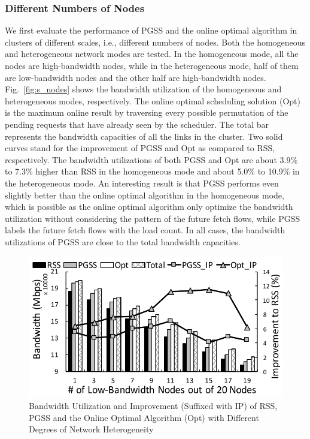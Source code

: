 \documentclass[10pt,journal,compsoc]{IEEEtran}
\begin{document}
\subsubsection{Different Numbers of Nodes}\label{section:differentNodeNumber}
We first evaluate the performance of PGSS and the online optimal algorithm in clusters of
different scales, i.e., different numbers of nodes.
Both the homogeneous and heterogeneous network modes are tested. 
In the homogeneous mode, all the nodes are high-bandwidth nodes, 
while in the heterogeneous mode, half of them are low-bandwidth nodes
and the other half are high-bandwidth nodes.
Fig.~\ref{fig:s_nodes} shows the bandwidth utilization of the homogeneous and
heterogeneous modes,
respectively. 
The online optimal scheduling solution (Opt) is the maximum online result by traversing every possible permutation of the pending requests that have already seen by the scheduler. 
The total bar represents the bandwidth capacities of all the links in the cluster. Two solid curves stand for the improvement of PGSS and Opt as compared to RSS, respectively.
The bandwidth utilizations of both PGSS and Opt 
are about 3.9\% to 7.3\% higher than RSS in the homogeneous mode
and about 5.0\% to 10.9\% in the heterogeneous mode. 
An interesting result is that PGSS performs even slightly better than the online optimal algorithm in the homogeneous mode, which is possible as the online optimal algorithm only optimize the bandwidth utilization without considering the pattern of the future fetch flows, while PGSS labels the future fetch flows with the load count. 
In all cases, the bandwidth utilizations of PGSS are close to the total bandwidth capacities.

\begin{figure}[!t]
\centering

\includegraphics[width=0.8\columnwidth,height=0.4\columnwidth]{figure14}

\caption{Bandwidth Utilization and Improvement (Suffixed with   IP) of RSS, PGSS and the Online Optimal Algorithm (Opt) with Different Degrees of Network Heterogeneity}
\label{fig:s_lowbandwidth}
\end{figure}
\end{document}
